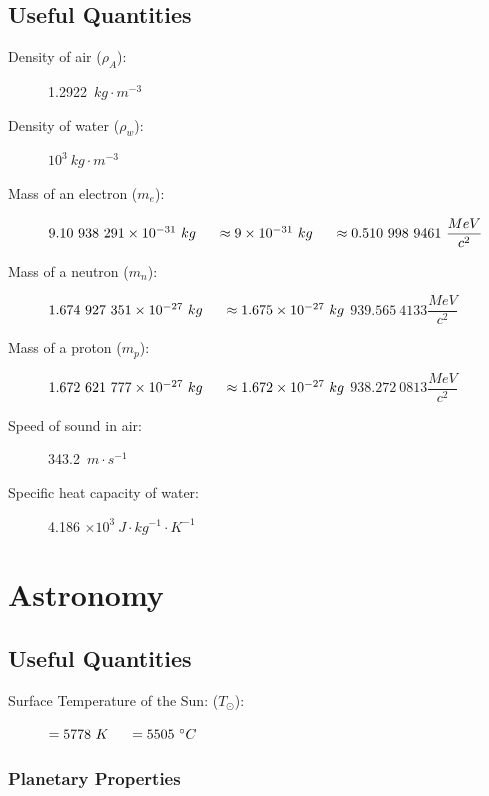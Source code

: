 \documentclass[]{report}
\newcommand \tab[1][1cm]{\hspace*{#1}}
\newcommand{\degrees}{^{\circ}}
\begin{document}
\subsection{Useful Quantities}
\begin{description}			
\item[Density of air ($\rho_A$):] 1.2922\ $kg \cdot m^{-3}$				
\item[Density of water ($\rho_w$):] $10^3\ kg \cdot m^{-3}$				
\item[Mass of an electron ($m_e$):] $ 9.10\ 938\ 291 \times 10^{-31}\ kg \tab[0.5cm] \approx  9 \times 10^{-31}\ kg \tab[0.5cm] \approx 0.510\ 998\ 9461\ \dfrac{MeV}{c^2} $
\item[Mass of a neutron ($m_n$):] $1.674\ 927\ 351 \times 10^{-27}\ kg \tab[0.5cm]\approx  1.675 \times 10^{-27}\ kg$				
\subitem \( 939.565\ 4133 \dfrac{MeV}{c^2} \)
\item[Mass of a proton ($m_p$):] $1.672\ 621\ 777 \times 10^{-27}\ kg \tab[0.5cm] \approx  1.672 \times 10^{-27}\ kg$					
\subitem \( 938.272\ 0813 \dfrac{MeV}{c^2} \)
\item[Speed of sound in air:] 343.2\ $m\cdot s^{-1}$				
\item[Specific heat capacity of water:] 4.186 $\times 10^3\ J \cdot kg^{-1} \cdot K^{-1}$
\end{description}



\section{Astronomy}


\subsection{Useful Quantities}
\begin{description}			

\item[Surface Temperature of the Sun: ($T_\odot$):] $= 5778\ K\tab[0.5cm]= 5505\ \degrees C$                   
\end{description}

\subsubsection{Planetary Properties}
\end{document}
